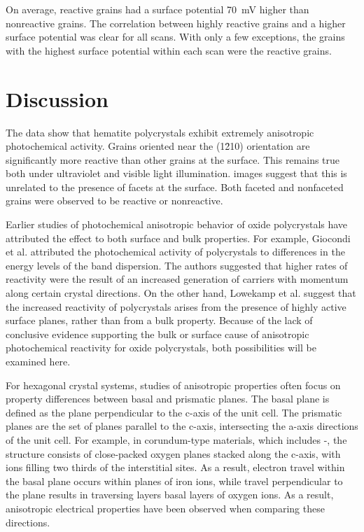 On average, reactive grains had a surface potential \SI{70}{\milli\volt} higher than
nonreactive grains. The correlation between highly reactive grains and a higher surface
potential was clear for all scans. With only a few exceptions, the grains with the highest
surface potential within each scan were the reactive grains.

\section{Discussion}\label{sec:ch9discussion}

The data show that hematite polycrystals exhibit extremely anisotropic photochemical
activity. Grains oriented near the (1\={2}10) orientation are significantly more reactive
than other grains at the surface. This remains true both under ultraviolet and visible
light illumination.  images suggest that this is unrelated to the presence of
facets at the surface. Both faceted and nonfaceted grains were observed to be reactive or
nonreactive.

Earlier studies of photochemical anisotropic behavior of oxide polycrystals have
attributed the effect to both surface and bulk properties. For example, Giocondi et
al.\cite{Giocondi:2007fa} attributed the photochemical activity of 
polycrystals to differences in the energy levels of the band dispersion. The authors
suggested that higher rates of reactivity were the result of an increased generation of
carriers with momentum along certain crystal directions. On the other hand, Lowekamp et
al.\cite{Lowekamp:1998ks} suggest that the increased reactivity of  polycrystals
arises from the presence of highly active surface planes, rather than from a bulk
property. Because of the lack of conclusive evidence supporting the bulk or surface cause
of anisotropic photochemical reactivity for oxide polycrystals, both possibilities will be
examined here.

For hexagonal crystal systems, studies of anisotropic properties often focus on property
differences between basal and prismatic planes. The basal plane is defined as the plane
perpendicular to the c-axis of the unit cell. The prismatic planes are the set of planes
parallel to the c-axis, intersecting the a-axis directions of the unit cell. For example,
in corundum-type materials, which includes \textalpha-, the structure consists
of close-packed oxygen planes stacked along the c-axis, with  ions filling two
thirds of the interstitial sites. As a result, electron travel within the basal plane
occurs within planes of iron ions, while travel perpendicular to the plane results in
traversing layers basal layers of oxygen ions.\cite{Iordanova:2005ha} As a result,
anisotropic electrical properties have been observed when comparing these
directions.\cite{Benjelloun:1984cq}

